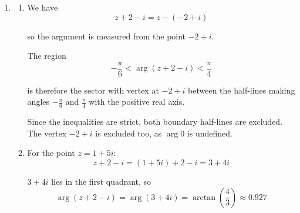 \documentclass[leqno]{article}
\begin{document}
\begin{enumerate}[
  label=\textbf{\arabic*.},
  leftmargin=*,
  topsep=0pt,
  partopsep=0pt,
  parsep=0pt
]
\begin{djsSolution}
\begin{enumerate}[label=\textbf{(\alph*)}]
\begin{enumerate}[label=(\roman*)]
    Circle $A$ has centre $-2+4i$ and radius $3$, so
    \[
    |z-(-2+4i)|=3
    \]

    hence the circumference of circle $A$ is
    \[
    |z+2-4i|=3
    \]

    \item The shaded region is the part inside both circles, and neither circumference is included.

    Inside circle $A$:
    \[
    |z+2-4i|<3
    \]

    Circle $B$ has centre $2+6i$ and radius $4$, so inside circle $B$:
    \[
    |z-(2+6i)|<4
    \]

    So the two inequalities are
    \[
    |z+2-4i|<3
    \qquad \text{and} \qquad
    |z-(2+6i)|<4
    \]
  \end{enumerate}

  \item \begin{enumerate}[label=(\roman*)]
    \item We have
    \[
    z+2-i=z-(-2+i)
    \]

    so the argument is measured from the point $-2+i$.

    The region
    \[
    -\frac{\pi}{6}<\arg(z+2-i)<\frac{\pi}{4}
    \]

    is therefore the sector with vertex at $-2+i$ between the half-lines making angles $-\frac{\pi}{6}$ and $\frac{\pi}{4}$ with the positive real axis.

    Since the inequalities are strict, both boundary half-lines are excluded. The vertex $-2+i$ is excluded too, as $\arg 0$ is undefined.\par\nopagebreak


    \item For the point $z=1+5i$:
    \[
    z+2-i=(1+5i)+2-i=3+4i
    \]

    \(3+4i\) lies in the first quadrant, so
    \[
    \arg(z+2-i)=\arg(3+4i)=\arctan\left(\frac{4}{3}\right)\approx 0.927
    \]


\end{enumerate}
\end{enumerate}
\end{djsSolution}
\end{enumerate}
\end{document}
